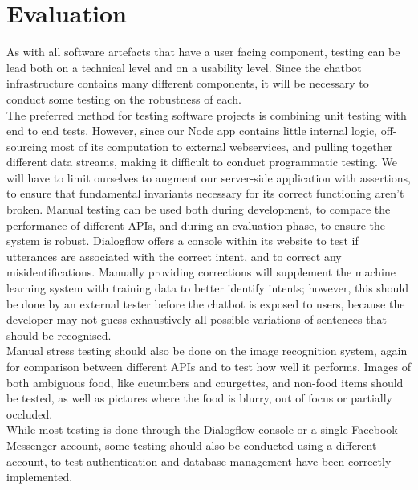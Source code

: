 \documentclass{scrartcl}
\begin{document}
\section*{Evaluation}
As with all software artefacts that have a user facing component, testing can be lead both on a technical level and on a usability level.
Since the chatbot infrastructure contains many different components, it will be necessary to conduct some testing on the robustness of each. \\

The preferred method for testing software projects is combining unit testing with end to end tests. However, since our Node app contains little internal logic, off-sourcing most of its computation to external webservices, and pulling together different data streams, making it difficult to conduct programmatic testing. We will have to limit ourselves to augment our server-side application with assertions, to ensure that fundamental invariants necessary for its correct functioning aren't broken. Manual testing can be used both during development, to compare the performance of different APIs, and during an evaluation phase, to ensure the system is robust. Dialogflow offers a console within its website to test if utterances are associated with the correct intent, and to correct any misidentifications. Manually providing corrections will supplement the machine learning system with training data to better identify intents; however, this should be done by an external tester before the chatbot is exposed to users, because the developer may not guess exhaustively all possible variations of sentences that should be recognised. \\

Manual stress testing should also be done on the image recognition system, again for comparison between different APIs and to test how well it performs. Images of both ambiguous food, like cucumbers and courgettes, and non-food items should be tested, as well as pictures where the food is blurry, out of focus or partially occluded. \\

While most testing is done through the Dialogflow console or a single Facebook Messenger account, some testing should also be conducted using a different account, to test authentication and database management have been correctly implemented.\\
\end{document}
